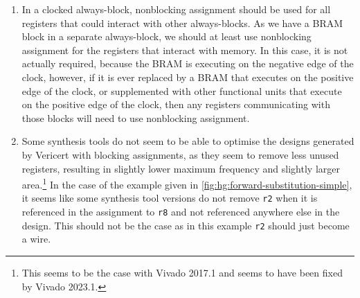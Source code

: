 \begin{enumerate}
\item In a clocked always-block, nonblocking assignment should be used for all
  registers that could interact with other always-blocks.  As we have a
  \gls{BRAM} block in a separate always-block, we should at least use
  nonblocking assignment for the registers that interact with memory.  In this
  case, it is not actually required, because the \gls{BRAM} is executing on the
  negative edge of the clock, however, if it is ever replaced by a \gls{BRAM}
  that executes on the positive edge of the clock, or supplemented with other
  functional units that execute on the positive edge of the clock, then any
  registers communicating with those blocks will need to use nonblocking
  assignment.
\item Some synthesis tools do not seem to be able to optimise the designs
  generated by Vericert with blocking assignments, as they seem to remove less
  unused registers, resulting in slightly lower maximum frequency and slightly
  larger area.\footnote{This seems to be the case with Vivado 2017.1 and seems
    to have been fixed by Vivado 2023.1.}  In the case of the example given in
  \cref{fig:hg:forward-substitution-simple}, it seems like some synthesis tool
  versions do not remove \texttt{r2} when it is referenced in the assignment to
  \texttt{r8} and not referenced anywhere else in the design.  This should not
  be the case as in this example \texttt{r2} should just become a wire.
\end{enumerate}

\newcommand\mathstate[1]{\veriloginline`//` \textcolor{mathcommentcolor}{#1}}
\makeatletter
\newcommand\mathstateln[2]{{\tiny #1 \quad}\my@name@mathstateln{#1}}
\NewDocumentCommand {}
\makeatother

\newcommand\asgnblockingbefore{\Gamma}
\newcommand\asgnblockingafter{\Gamma'}
\newcommand\asgnnonblockingbefore{\Delta}
\newcommand\asgnnonblockingafter{\Delta'}

\newcommand\interstate[2]{{#2}^{#1}_{\mathrm r}}
\newcommand\initialstate[1]{{#1}^{0}_{\mathrm r}}

